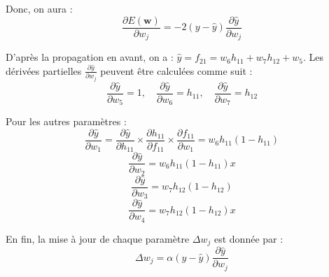 {\begin{enumerate}
{Donc, on aura :
\[
\frac{\partial E(\mathbf{w})}{\partial w_j} = -2(y - \hat{y}) \frac{\partial \hat{y}}{\partial w_j}
\]

D’après la propagation en avant, on a : $\hat{y} = f_{21} = w_6 h_{11} + w_7 h_{12} + w_5$.  
Les dérivées partielles $\frac{\partial \hat{y}}{\partial w_j}$ peuvent être calculées comme suit :
\[
\frac{\partial \hat{y}}{\partial w_5} = 1, \quad
\frac{\partial \hat{y}}{\partial w_6} = h_{11}, \quad
\frac{\partial \hat{y}}{\partial w_7} = h_{12}
\]

Pour les autres paramètres :
\[
\frac{\partial \hat{y}}{\partial w_1} = \frac{\partial \hat{y}}{\partial h_{11}} \times \frac{\partial h_{11}}{\partial f_{11}} \times \frac{\partial f_{11}}{\partial w_1} = w_6 h_{11}(1 - h_{11})
\]
\[
\frac{\partial \hat{y}}{\partial w_2} = w_6 h_{11}(1 - h_{11}) x
\]
\[
\frac{\partial \hat{y}}{\partial w_3} = w_7 h_{12}(1 - h_{12})
\]
\[
\frac{\partial \hat{y}}{\partial w_4} = w_7 h_{12}(1 - h_{12}) x
\]

En fin, la mise à jour de chaque paramètre $\Delta w_j$ est donnée par :
\[
\Delta w_j = \alpha (y - \hat{y}) \frac{\partial \hat{y}}{\partial w_j}
\]
}

\end{enumerate}

}

